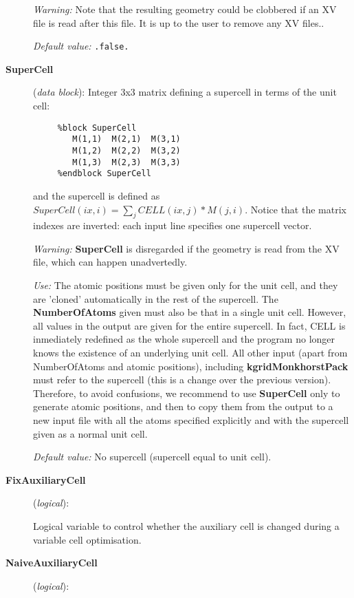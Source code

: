 \documentclass[11pt]{article}
\begin{document}
\begin{description}
{\it Warning:} Note that the resulting geometry could be clobbered if
an XV file is read after this file. It is up to the user to remove
any XV files..

{\it Default value:} {\tt .false.}


\item[{\bf SuperCell}] ({\it data block}): 
Integer 3x3 matrix defining a supercell in terms of the unit cell: 

\begin{verbatim}
     %block SuperCell
        M(1,1)  M(2,1)  M(3,1) 
        M(1,2)  M(2,2)  M(3,2) 
        M(1,3)  M(2,3)  M(3,3) 
     %endblock SuperCell
\end{verbatim}

and the supercell is defined as
$SuperCell(ix,i) = \sum_j CELL(ix,j)*M(j,i)$.
Notice that the matrix indexes are inverted: each input line 
specifies one supercell vector.

{\it Warning:} {\bf SuperCell} is disregarded if the geometry is read from
the XV file, which can happen unadvertedly.

{\it Use:} The atomic positions must be given only for the unit cell,
and they are 'cloned' automatically in the rest of the supercell.
The {\bf NumberOfAtoms} given must also be that in a single unit cell.
However, all values in the output are given for the entire supercell. 
In fact, CELL is inmediately redefined as the whole supercell and the 
program no longer knows the existence of an underlying unit cell.
All other input (apart from NumberOfAtoms and atomic positions), 
including {\bf kgridMonkhorstPack} must refer to the supercell 
(this is a change over the previous version). Therefore, to avoid
confusions, we recommend to use {\bf SuperCell} only to
generate atomic positions, and then to copy them from the output
to a new input file with all the atoms specified explicitly and
with the supercell given as a normal unit cell.

{\it Default value:} No supercell (supercell equal to unit cell).

\item[{\bf FixAuxiliaryCell}] ({\it logical}): 

Logical variable to control whether the auxiliary cell is changed
during a variable cell optimisation.

\item[{\bf NaiveAuxiliaryCell}] ({\it logical}): 


\end{description}
\end{document}
